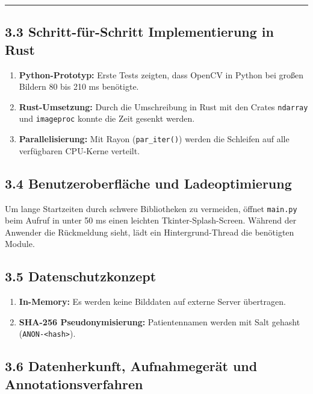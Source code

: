 \documentclass[
  11pt,
]{article}
\providecommand{\tightlist}{%
  \setlength{\itemsep}{0pt}\setlength{\parskip}{0pt}}
\begin{document}
\begin{center}\rule{0.5\linewidth}{0.5pt}\end{center}

\subsection{3.3 Schritt-für-Schritt Implementierung in
Rust}\label{schritt-fuxfcr-schritt-implementierung-in-rust}

\begin{enumerate}
\def\labelenumi{\arabic{enumi}.}
\tightlist
\item
  \textbf{Python-Prototyp:} Erste Tests zeigten, dass OpenCV in Python
  bei großen Bildern 80 bis 210 ms benötigte.
\item
  \textbf{Rust-Umsetzung:} Durch die Umschreibung in Rust mit den Crates
  \texttt{ndarray} und \texttt{imageproc} konnte die Zeit gesenkt
  werden.
\item
  \textbf{Parallelisierung:} Mit Rayon (\texttt{par\_iter()}) werden die
  Schleifen auf alle verfügbaren CPU-Kerne verteilt.
\end{enumerate}

\subsection{3.4 Benutzeroberfläche und
Ladeoptimierung}\label{benutzeroberfluxe4che-und-ladeoptimierung}

Um lange Startzeiten durch schwere Bibliotheken zu vermeiden, öffnet
\texttt{main.py} beim Aufruf in unter 50 ms einen leichten
Tkinter-Splash-Screen. Während der Anwender die Rückmeldung sieht, lädt
ein Hintergrund-Thread die benötigten Module.

\subsection{3.5 Datenschutzkonzept}\label{datenschutzkonzept}

\begin{enumerate}
\def\labelenumi{\arabic{enumi}.}
\tightlist
\item
  \textbf{In-Memory:} Es werden keine Bilddaten auf externe Server
  übertragen.
\item
  \textbf{SHA-256 Pseudonymisierung:} Patientennamen werden mit Salt
  gehasht (\texttt{ANON-\textless{}hash\textgreater{}}).
\end{enumerate}

\subsection{3.6 Datenherkunft, Aufnahmegerät und
Annotationsverfahren}\label{datenherkunft-aufnahmegeruxe4t-und-annotationsverfahren}
\end{document}
